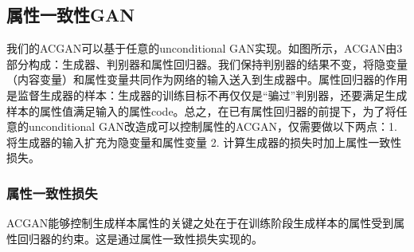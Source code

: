 \subsection{属性一致性GAN}
我们的ACGAN可以基于任意的unconditional GAN实现。如图所示，ACGAN由3部分构成：生成器、判别器和属性回归器。我们保持判别器的结果不变，将隐变量（内容变量）和属性变量共同作为网络的输入送入到生成器中。属性回归器的作用是监督生成器的样本：生成器的训练目标不再仅仅是“骗过”判别器，还要满足生成样本的属性值满足输入的属性code。总之，在已有属性回归器的前提下，为了将任意的unconditional GAN改造成可以控制属性的ACGAN，仅需要做以下两点：1. 将生成器的输入扩充为隐变量和属性变量 2. 计算生成器的损失时加上属性一致性损失。

\subsubsection{属性一致性损失}
ACGAN能够控制生成样本属性的关键之处在于在训练阶段生成样本的属性受到属性回归器的约束。这是通过属性一致性损失实现的。

